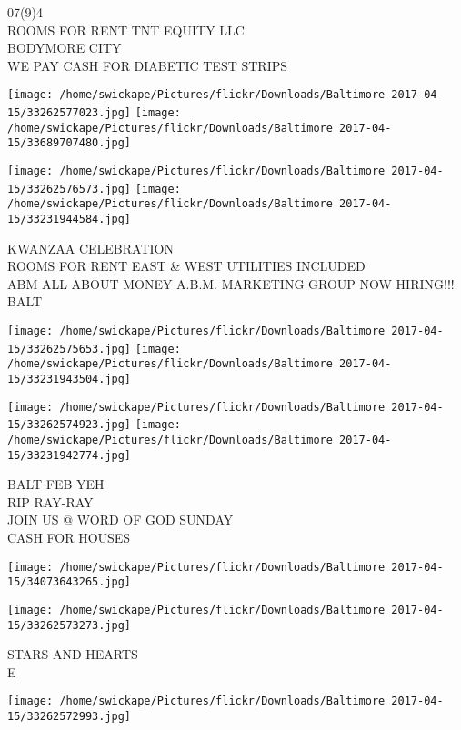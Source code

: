 \documentclass[10pt,letterpaper]{article}
\begin{document}
07(9)4\\
ROOMS FOR RENT TNT EQUITY LLC\\
BODYMORE CITY\\
WE PAY CASH FOR DIABETIC TEST STRIPS\\
\pagebreak

\texttt{[image: /home/swickape/Pictures/flickr/Downloads/Baltimore 2017-04-15/33262577023.jpg]}
\texttt{[image: /home/swickape/Pictures/flickr/Downloads/Baltimore 2017-04-15/33689707480.jpg]}

\texttt{[image: /home/swickape/Pictures/flickr/Downloads/Baltimore 2017-04-15/33262576573.jpg]}
\texttt{[image: /home/swickape/Pictures/flickr/Downloads/Baltimore 2017-04-15/33231944584.jpg]}

KWANZAA CELEBRATION\\
ROOMS FOR RENT EAST \& WEST UTILITIES INCLUDED\\
ABM ALL ABOUT MONEY A.B.M. MARKETING GROUP NOW HIRING!!!\\
BALT\\
\pagebreak

\texttt{[image: /home/swickape/Pictures/flickr/Downloads/Baltimore 2017-04-15/33262575653.jpg]}
\texttt{[image: /home/swickape/Pictures/flickr/Downloads/Baltimore 2017-04-15/33231943504.jpg]}

\texttt{[image: /home/swickape/Pictures/flickr/Downloads/Baltimore 2017-04-15/33262574923.jpg]}
\texttt{[image: /home/swickape/Pictures/flickr/Downloads/Baltimore 2017-04-15/33231942774.jpg]}

BALT FEB YEH\\
RIP RAY{-}RAY\\
JOIN US @ WORD OF GOD SUNDAY\\
CASH FOR HOUSES\\
\pagebreak

\texttt{[image: /home/swickape/Pictures/flickr/Downloads/Baltimore 2017-04-15/34073643265.jpg]}

\vspace{0.25in}
\texttt{[image: /home/swickape/Pictures/flickr/Downloads/Baltimore 2017-04-15/33262573273.jpg]}

STARS AND HEARTS\\
E\\
\pagebreak

\texttt{[image: /home/swickape/Pictures/flickr/Downloads/Baltimore 2017-04-15/33262572993.jpg]}
\end{document}
